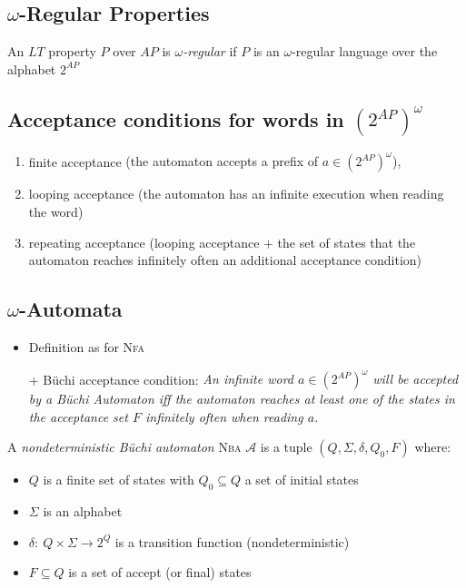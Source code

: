 \documentclass[a4paper, 10pt]{article}
\begin{document}
\subsection*{$\omega$-Regular Properties}
\begin{shaded}
        An $LT$ property $P$ over $AP$ is \emph{$\omega$-regular} if $P$ is an $\omega$-regular language over the alphabet $2^{AP}$
\end{shaded}

\subsection*{Acceptance conditions for words in $(2^{AP})^\omega$}
\begin{enumerate}
    \item finite acceptance {\tiny (the automaton accepts a prefix of $a\in(2^{AP})^\omega$), }
    \item looping acceptance {\tiny (the automaton has an infinite execution when reading the word) }
    \item repeating acceptance {\tiny (looping acceptance $+$ the set of states that the automaton reaches infinitely often an additional acceptance condition) }
\end{enumerate}

\subsection*{$\omega$-Automata}
\begin{itemize}
    \item Definition as for \textsc{Nfa}
    \item[+] Büchi acceptance condition: \emph{An infinite word $a\in(2^{AP})^\omega$ will be accepted by a Büchi Automaton iff the automaton reaches at least one of the states in the acceptance set $F$ infinitely often when reading $a$.}
\end{itemize}
\begin{shaded}
    A \emph{nondeterministic Büchi automaton} \textsc{Nba} $\mathcal{A}$ is a tuple $(Q,\Sigma,\delta,Q_0,F)$ where:
    \begin{itemize}
        \item $Q$ is a finite set of states with $Q_0\subseteq Q$ a set of initial states
        \item $\Sigma$ is an alphabet
        \item $\delta:\ Q\times\Sigma\to2^Q$ is a transition function {\tiny (nondeterministic)}
        \item $F\subseteq Q$ is a set of accept (or final) states
    \end{itemize}
\end{shaded}
\end{document}
